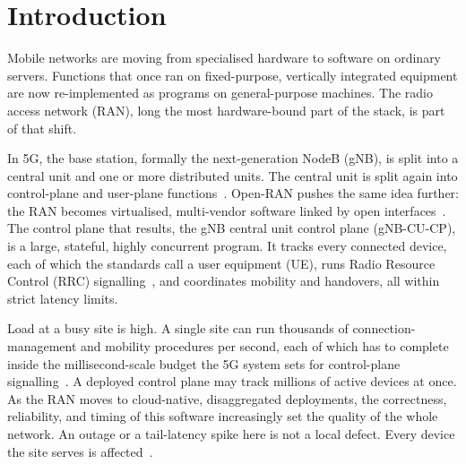 \documentclass[english,oneside,a4paper,censored,csm,software-track-2020]{HYthesisML}
\begin{document}
\cleardoublepage

\mainmatter

\singlespacing

\chapter{Introduction}

Mobile networks are moving from specialised hardware to software on ordinary servers.
Functions that once ran on fixed-purpose, vertically integrated equipment are now
re-implemented as programs on general-purpose machines. The radio access network (RAN),
long the most hardware-bound part of the stack, is part of that shift.

In 5G, the base station, formally the next-generation NodeB (gNB), is split into a central
unit and one or more distributed units. The central unit is split again into control-plane
and user-plane functions~\cite{3gpp38401,3gpp38300}. Open-RAN pushes the same idea further:
the RAN becomes virtualised, multi-vendor software linked by open
interfaces~\cite{polese2023oran}. The control plane that results, the gNB central unit
control plane (gNB-CU-CP), is a large, stateful, highly concurrent program. It tracks every
connected device, each of which the standards call a user equipment (UE), runs Radio Resource
Control (RRC) signalling~\cite{3gpp38331}, and coordinates mobility and handovers, all within
strict latency limits.

Load at a busy site is high. A single site can run thousands of connection-management and
mobility procedures per second, each of which has to complete inside the millisecond-scale
budget the 5G system sets for control-plane signalling~\cite{3gpp38913}. A deployed control plane may track millions of active
devices at once. As the RAN moves to cloud-native, disaggregated deployments, the
correctness, reliability, and timing of this software increasingly set the quality of the
whole network. An outage or a tail-latency spike here is not a local defect. Every device
the site serves is affected~\cite{dean2013tail,barroso2017microseconds}.
\end{document}
